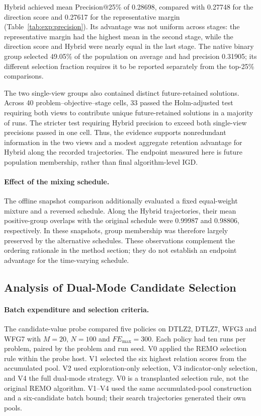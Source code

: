 Hybrid achieved mean Precision@25\% of 0.28698, compared with 0.27748
for the direction score and 0.27617 for the representative margin
(Table~\ref{tab:exp:precision}). Its advantage was not uniform across
stages: the representative margin had the highest mean in the second
stage, while the direction score and Hybrid were nearly equal in the
last stage. The native binary group selected 49.05\% of the population
on average and had precision 0.31905; its different selection fraction
requires it to be reported separately from the top-25\% comparisons.

The two single-view groups also contained distinct future-retained
solutions. Across 40 problem--objective--stage cells, 33 passed the
Holm-adjusted test requiring both views to contribute unique
future-retained solutions in a majority of runs. The stricter test
requiring Hybrid precision to exceed both single-view precisions passed
in one cell. Thus, the evidence supports nonredundant information in the
two views and a modest aggregate retention advantage for Hybrid along
the recorded trajectories. The endpoint measured here is future
population membership, rather than final algorithm-level IGD.

\paragraph{Effect of the mixing schedule.}
The offline snapshot comparison additionally evaluated a fixed
equal-weight mixture and a reversed schedule. Along the Hybrid
trajectories, their mean positive-group overlaps with the original
schedule were 0.99987 and 0.98806, respectively. In these snapshots,
group membership was therefore largely preserved by the alternative
schedules. These observations complement the ordering rationale in the
method section; they do not establish an endpoint advantage for the
time-varying schedule.


\subsection{Analysis of Dual-Mode Candidate Selection}
\label{sec:exp:candidate}

\paragraph{Batch expenditure and selection criteria.}
The candidate-value probe compared five policies on DTLZ2, DTLZ7, WFG3
and WFG7 with $M=20$, $N=100$ and $FE_{\max}=300$. Each policy had ten
runs per problem, paired by the problem and run seed. V0 applied the
REMO selection rule within the probe host. V1 selected the six highest
relation scores from the accumulated pool. V2 used exploration-only
selection, V3 indicator-only selection, and V4 the full dual-mode
strategy. V0 is a transplanted selection rule, not the original REMO
algorithm. V1--V4 used the same accumulated-pool construction and a
six-candidate batch bound; their search trajectories generated their
own pools.

